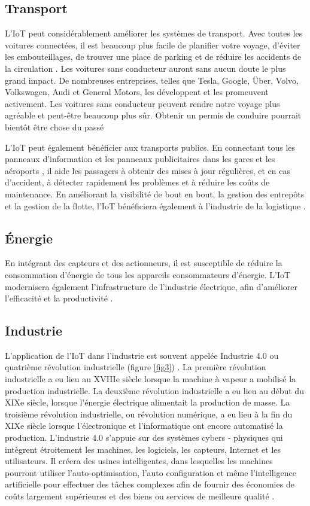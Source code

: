 \subsection{Transport}
L'IoT peut considérablement améliorer les systèmes de transport. Avec toutes les voitures connectées, il est beaucoup plus facile de planifier votre voyage, d'éviter les embouteillages, de trouver une place de parking et de réduire les accidents de la circulation \cite{kong2017millimeter}. Les voitures sans conducteur auront sans aucun doute le plus grand impact. De nombreuses entreprises, telles que Tesla, Google, Über, Volvo, Volkswagen, Audi et General Motors, les développent et les promeuvent activement. Les voitures sans conducteur peuvent rendre notre voyage plus agréable et peut-être beaucoup plus sûr. Obtenir un permis de conduire pourrait bientôt être chose du passé \cite{petrov2017vehicle}

L'IoT peut également bénéficier aux transports publics. En connectant tous les panneaux d'information et les panneaux publicitaires dans les gares et les aéroports \cite{ashokkumar2015cloud}, il aide les passagers à obtenir des mises à jour régulières, et en cas d'accident, à détecter rapidement les problèmes et à réduire les coûts de maintenance. En améliorant la visibilité de bout en bout, la gestion des entrepôts et la gestion de la flotte, l'IoT bénéficiera également à l'industrie de la logistique \cite{kong2017millimeter}.

\subsection{Énergie}
En intégrant des capteurs et des actionneurs, il est susceptible de réduire la consommation d'énergie de tous les appareils consommateurs d'énergie. L'IoT modernisera également l'infrastructure de l'industrie électrique, afin d'améliorer l'efficacité et la productivité \cite{nathani2013energiebezogene}.
\subsection{Industrie}
L'application de l'IoT dans l'industrie est souvent appelée Industrie 4.0 ou quatrième révolution industrielle (figure \ref{fig3}) \cite{da2014internet}. La première révolution industrielle a eu lieu au XVIIIe siècle lorsque la machine à vapeur a mobilisé la production industrielle. La deuxième révolution industrielle a eu lieu au début du XIXe siècle, lorsque l'énergie électrique alimentait la production de masse. La troisième révolution industrielle, ou révolution numérique, a eu lieu à la fin du XIXe siècle lorsque l'électronique et l'informatique ont encore automatisé la production. L'industrie 4.0 s'appuie sur des systèmes cybers ‐ physiques qui intègrent étroitement les machines, les logiciels, les capteurs, Internet et les utilisateurs. Il créera des usines intelligentes, dans lesquelles les machines pourront utiliser l'auto-optimisation, l'auto configuration et même l'intelligence artificielle pour effectuer des tâches complexes afin de fournir des économies de coûts largement supérieures et des biens ou services de meilleure qualité \cite{wan2015industrie}.


